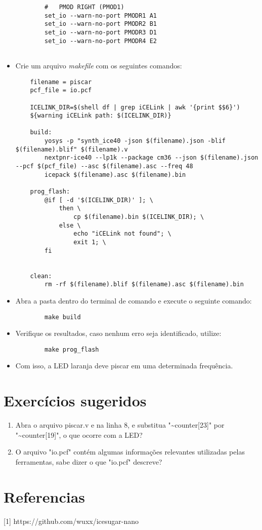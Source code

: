 \documentclass{article}
\begin{document}
\begin{itemize}
\begin{verbatim}
        #   PMOD RIGHT (PMOD1)
        set_io --warn-no-port PMODR1 A1
        set_io --warn-no-port PMODR2 B1
        set_io --warn-no-port PMODR3 D1
        set_io --warn-no-port PMODR4 E2
        
    \end{verbatim}
    
    \item Crie um arquivo \textit{makefile} com os seguintes comandos:
    
    \begin{verbatim}
    filename = piscar
    pcf_file = io.pcf

    ICELINK_DIR=$(shell df | grep iCELink | awk '{print $$6}')
    ${warning iCELink path: $(ICELINK_DIR)}

    build:
    	yosys -p "synth_ice40 -json $(filename).json -blif $(filename).blif" $(filename).v
    	nextpnr-ice40 --lp1k --package cm36 --json $(filename).json --pcf $(pcf_file) --asc $(filename).asc --freq 48
    	icepack $(filename).asc $(filename).bin

    prog_flash:
	    @if [ -d '$(ICELINK_DIR)' ]; \
            then \
                cp $(filename).bin $(ICELINK_DIR); \
            else \
                echo "iCELink not found"; \
                exit 1; \
        fi


    clean:
	    rm -rf $(filename).blif $(filename).asc $(filename).bin
    \end{verbatim}
    
    \item Abra a pasta dentro do terminal de comando e execute o seguinte comando:    
    \begin{verbatim}
        make build
    \end{verbatim}
    \item Verifique os resultados, caso nenhum erro seja identificado, utilize:
     \begin{verbatim}
        make prog_flash
    \end{verbatim}
    \item Com isso, a LED laranja deve piscar em uma determinada frequência.
\end{itemize}

\section{Exercícios sugeridos}
\begin{enumerate}
    \item Abra o arquivo piscar.v e na linha 8, e substitua "\textasciitilde counter[23]" por "\textasciitilde counter[19]", o que ocorre com a LED?
    \item O arquivo "io.pcf" contém algumas informações relevantes utilizadas pelas ferramentas, sabe dizer o que "io.pcf" descreve?
    
\end{enumerate}

\section*{Referencias}
\textnormal{\footnotesize{[1] https://github.com/wuxx/icesugar-nano}}
\end{document}
